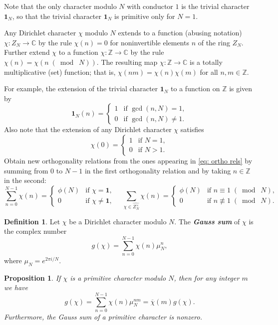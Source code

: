 \documentclass[10pt,leqno,twoside]{article}
\theoremstyle{plain}
\newtheorem{proposition}[lem]{Proposition}
\theoremstyle{definition}
\newtheorem{definition/}[lem]{Definition}
\newenvironment{definition}
  {\renewcommand{\qedsymbol}{\textdagger}%
   \pushQED{\qed}\begin{definition/}}
  {\popQED\end{definition/}}
\numberwithin{equation}{section}
\numberwithin{lem}{section}
\newcommand{\textib}[1]{\textbf{\textit{#1\index{#1}}}} %
\newcommand{\smod}[1]{\;(\bmod\; #1)}
\begin{document}
Note that the only character modulo $N$ with conductor $1$ is the trivial character $\mathbf 1_N$, so that the trivial character $\mathbf 1_N$ is primitive only for $N = 1$.

Any Dirichlet character $\chi$ modulo $N$ extends to a function (abusing notation) $\chi\colon Z_N\to\mathbb C$ by the rule $\chi(n) = 0$ for noninvertible elements $n$ of the ring $Z_N$. Further extend $\chi$ to a function $\chi\colon\mathbb Z\to\mathbb C$ by the rule $\chi(n) = \chi(n\smod N)$. The resulting map $\chi\colon \mathbb Z\to \mathbb C$ is a totally multiplicative (set) function; that is, $\chi(nm) = \chi(n)\chi(m)$ for all $n,m\in \mathbb Z$.

For example, the extension of the trivial character $\mathbf 1_N$ to a function on $\mathbb Z$ is given by
\[\mathbf 1_N(n) = \begin{cases}
    1 & \text{if $\gcd(n,N)=1$},\\
    0 & \text{if $\gcd(n,N)\neq1$}.
\end{cases}\]
Also note that the extension of any Dirichlet character $\chi$ satisfies 
\[\chi(0) = \begin{cases}
    1 & \text{if $N = 1$},\\
    0 & \text{if $N > 1$}.
\end{cases}\]
Obtain new orthogonality relations from the ones appearing in \cref{eq: ortho rels} by summing from $0$ to $N-1$ in the first orthogonality relation and by taking $n\in\mathbb Z$ in the second:
\begin{equation}\label{eq: new ortho rels}
    \sum_{n=0}^{N-1}\chi(n) = \begin{cases}
        \phi(N) & \text{if $\chi = \mathbf 1$},\\
        0 & \text{if $\chi\neq \mathbf 1$},
    \end{cases}\quad\sum_{\chi\in \widehat{Z_N^\times}}\chi(n) = \begin{cases}
        \phi(N) & \text{if $n\equiv 1\smod N$},\\
        0 & \text{if $n\not\equiv 1\smod N$}.
    \end{cases} 
\end{equation}
\begin{definition}
    Let $\chi$ be a Dirichlet character modulo $N$. The \textib{Gauss sum} of $\chi$ is the complex number
    \[g(\chi) = \sum_{n=0}^{N-1}\chi(n)\mu_N^n,\] where $\mu_N = e^{2\pi i/N}$.
\end{definition}
\begin{proposition}
    If $\chi$ is a primitive character modulo $N$, then for any integer $m$ we have 
    \[g(\chi) = \sum_{n=0}^{N-1}\chi(n)\mu_N^{nm} = \overline\chi(m)g(\chi).\] Furthermore, the Gauss sum of a primitive character is nonzero.
\end{proposition}
\end{document}
